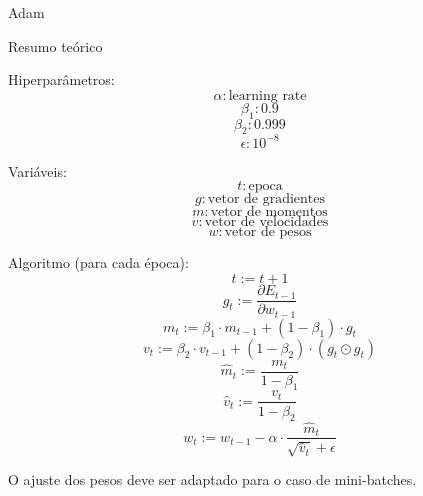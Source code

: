 \documentclass{article}
\begin{document}
\centerline{\sc \large Adam}
\vspace{.5pc}
\centerline{\sc Resumo teórico}
\vspace{4pc}

Hiperparâmetros:
\[ \alpha: \textrm{learning rate}  \]
\[ \beta_1: 0.9 \]
\[ \beta_2: 0.999 \]
\[ \epsilon: 10^{-8} \]
\vspace{3pc}

Variáveis:
\[ t: \textrm{epoca} \]
\[ g: \textrm{vetor de gradientes} \]
\[ m: \textrm{vetor de momentos} \]
\[ v: \textrm{vetor de velocidades} \]
\[ w: \textrm{vetor de pesos} \]
\vspace{3pc}

Algoritmo (para cada época):
\[ t := t + 1 \]
\[ g_t := \frac{\partial E_{t-1}}{\partial w_{t-1}} \]
\[ m_t := \beta_1 \cdot m_{t-1} + (1 - \beta_1) \cdot g_t \]
\[ v_t := \beta_2 \cdot v_{t-1} + (1 - \beta_2) \cdot (g_t \odot g_t) \]
\[ \hat{m}_t := \frac{m_t}{1 - \beta_1} \]
\[ \hat{v}_t := \frac{v_t}{1 - \beta_2} \]
\[ w_t := w_{t-1} - \alpha \cdot \frac{\hat{m}_t}{\sqrt{\hat{v}_t} + \epsilon} \]
\vspace{3pc}

O ajuste dos pesos deve ser adaptado para o caso de mini-batches.
\end{document}
